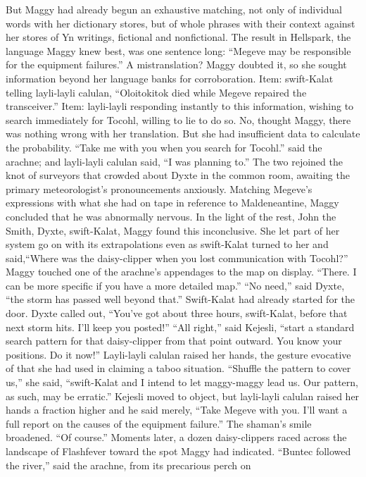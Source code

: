 \documentclass[9pt]{article}
\begin{document}
But Maggy had already begun an exhaustive matching, not only of individual words with her
dictionary stores, but of whole phrases with their context against her stores of Yn writings, fictional and
nonfictional.
The result in Hellspark, the language Maggy knew best, was one sentence long: “Megeve may be
responsible for the equipment failures.”
A mistranslation? Maggy doubted it, so she sought information beyond her language banks for
corroboration.
Item: swift-Kalat telling layli-layli calulan, “Oloitokitok died while Megeve repaired the
transceiver.”
Item: layli-layli responding instantly to this information, wishing to search immediately for Tocohl,
willing to lie to do so.
No, thought Maggy, there was nothing wrong with her translation. But she had insufficient data to
calculate the probability.
“Take me with you when you search for Tocohl.” said the arachne; and layli-layli calulan said, “I
was planning to.”
The two rejoined the knot of surveyors that crowded about Dyxte in the common room, awaiting the
primary meteorologist’s pronouncements anxiously. Matching Megeve’s expressions with what she had
on tape in reference to Maldeneantine, Maggy concluded that he was abnormally nervous. In the light of
the rest, John the Smith, Dyxte, swift-Kalat, Maggy found this inconclusive.
She let part of her system go on with its extrapolations even as swift-Kalat turned to her and said,“Where was the daisy-clipper when you lost communication with Tocohl?”
Maggy touched one of the arachne’s appendages to the map on display. “There. I can be more
specific if you have a more detailed map.”
“No need,” said Dyxte, “the storm has passed well beyond that.” Swift-Kalat had already started for
the door. Dyxte called out, “You’ve got about three hours, swift-Kalat, before that next storm hits. I’ll
keep you posted!”
“All right,” said Kejesli, “start a standard search pattern for that daisy-clipper from that point
outward. You know your positions. Do it now!”
Layli-layli calulan raised her hands, the gesture evocative of that she had used in claiming a taboo
situation. “Shuffle the pattern to cover us,” she said, “swift-Kalat and I intend to let maggy-maggy lead
us. Our pattern, as such, may be erratic.”
Kejesli moved to object, but layli-layli calulan raised her hands a fraction higher and he said
merely, “Take Megeve with you. I’ll want a full report on the causes of the equipment failure.”
The shaman’s smile broadened. “Of course.”
Moments later, a dozen daisy-clippers raced across the landscape of Flashfever toward the spot
Maggy had indicated. “Buntec followed the river,” said the arachne, from its precarious perch on
\end{document}
